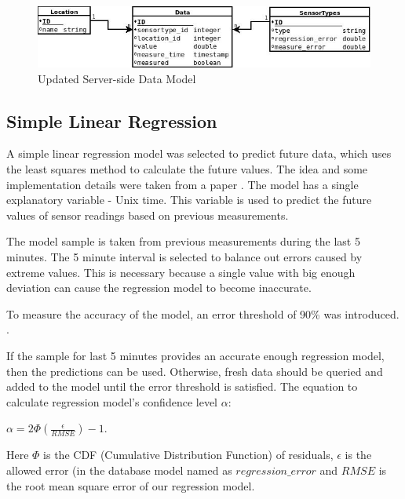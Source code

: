\begin{figure}[h!]
\centering
\includegraphics[scale=0.6]{4/figures/data_model_final.jpg}
\caption{Updated Server-side Data Model}
\label{data_model_final}
\end{figure}

\subsection{Simple Linear Regression}

A simple linear regression model was selected to predict future data, which uses the least squares method to calculate the future values. The idea and some implementation details were taken from a paper . The model has a single explanatory variable - Unix time. This variable is used to predict the future values of sensor readings based on previous measurements. 

The model sample is taken from previous measurements during the last  5 minutes. The 5 minute interval is selected to balance out errors caused by extreme values. This is necessary because a single value with big enough deviation can cause the regression model to become inaccurate. 

To measure the accuracy of the model, an error threshold of 90\% was introduced. . 

If the sample for last 5 minutes provides an accurate enough regression model, then the predictions can be used. Otherwise, fresh data should be queried and added to the model until the error threshold is satisfied. The equation to calculate regression model's confidence level $\alpha$:\\

\begin{center}
$\alpha = 2\Phi \left ( \frac{\epsilon}{RMSE}  \right ) - 1$.
\end{center}

Here $\Phi$ is the CDF (Cumulative Distribution Function) of residuals, $\epsilon$ is the allowed error (in the database model named as $regression\_error$ and $RMSE$ is the root mean square error  of our regression model.

